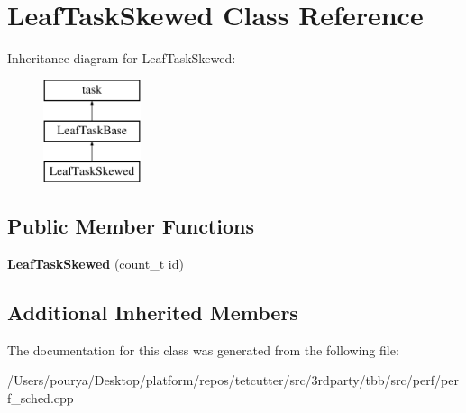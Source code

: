 \hypertarget{classLeafTaskSkewed}{}\section{Leaf\+Task\+Skewed Class Reference}
\label{classLeafTaskSkewed}
Inheritance diagram for Leaf\+Task\+Skewed\+:\begin{figure}[H]
\begin{center}
\leavevmode
\includegraphics[height=3.000000cm]{classLeafTaskSkewed}
\end{center}
\end{figure}
\subsection*{Public Member Functions}
\begin{DoxyCompactItemize}
\item 
\hypertarget{classLeafTaskSkewed_a1123a4ca0c0380c5cca57a851124e641}{}{\bfseries Leaf\+Task\+Skewed} (count\+\_\+t id)\label{classLeafTaskSkewed_a1123a4ca0c0380c5cca57a851124e641}

\end{DoxyCompactItemize}
\subsection*{Additional Inherited Members}


The documentation for this class was generated from the following file\+:\begin{DoxyCompactItemize}
\item 
/\+Users/pourya/\+Desktop/platform/repos/tetcutter/src/3rdparty/tbb/src/perf/perf\+\_\+sched.\+cpp\end{DoxyCompactItemize}

